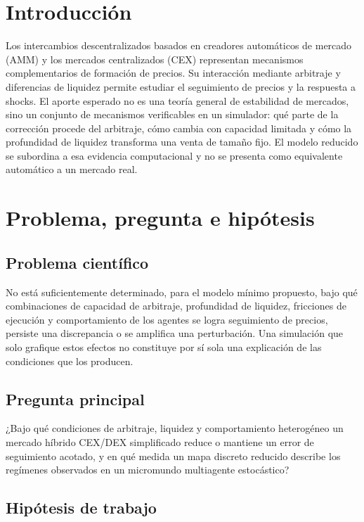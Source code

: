 \section{Introducción}

Los intercambios descentralizados basados en creadores automáticos de mercado (AMM) y
los mercados centralizados (CEX) representan mecanismos complementarios de
formación de precios. Su interacción mediante arbitraje y diferencias de liquidez
permite estudiar el seguimiento de precios y la respuesta a shocks. El aporte esperado
no es una teoría general de estabilidad de mercados, sino un conjunto de mecanismos
verificables en un simulador: qué parte de la corrección procede del arbitraje, cómo
cambia con capacidad limitada y cómo la profundidad de liquidez transforma una venta
de tamaño fijo. El modelo reducido se subordina a esa evidencia computacional y no se
presenta como equivalente automático a un mercado real.

\section{Problema, pregunta e hipótesis}

\subsection{Problema científico}

No está suficientemente determinado, para el modelo mínimo propuesto, bajo qué
combinaciones de capacidad de arbitraje, profundidad de liquidez, fricciones de
ejecución y comportamiento de los agentes se logra seguimiento de precios, persiste
una discrepancia o se amplifica una perturbación. Una simulación que solo grafique
estos efectos no constituye por sí sola una explicación de las condiciones que los
producen.

\subsection{Pregunta principal}

¿Bajo qué condiciones de arbitraje, liquidez y comportamiento heterogéneo un mercado
híbrido CEX/DEX simplificado reduce o mantiene un error de seguimiento acotado, y en
qué medida un mapa discreto reducido describe los regímenes observados en un
micromundo multiagente estocástico?

\subsection{Hipótesis de trabajo}

